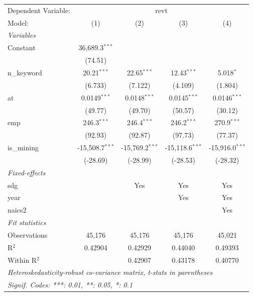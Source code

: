 
\begingroup
\centering
\begin{tabular}{lcccc}
   \tabularnewline \midrule \midrule
   Dependent Variable: & \multicolumn{4}{c}{revt}\\
   Model:       & (1)               & (2)               & (3)               & (4)\\  
   \midrule
   \emph{Variables}\\
   Constant     & 36,689.3$^{***}$  &                   &                   &   \\   
                & (74.51)           &                   &                   &   \\   
   n\_keyword   & 20.21$^{***}$     & 22.65$^{***}$     & 12.43$^{***}$     & 5.018$^{*}$\\   
                & (6.733)           & (7.122)           & (4.109)           & (1.804)\\   
   at           & 0.0149$^{***}$    & 0.0148$^{***}$    & 0.0145$^{***}$    & 0.0146$^{***}$\\   
                & (49.77)           & (49.70)           & (50.57)           & (30.12)\\   
   emp          & 246.3$^{***}$     & 246.4$^{***}$     & 246.2$^{***}$     & 270.9$^{***}$\\   
                & (92.93)           & (92.87)           & (97.73)           & (77.37)\\   
   is\_mining   & -15,508.7$^{***}$ & -15,769.2$^{***}$ & -15,118.6$^{***}$ & -15,916.0$^{***}$\\   
                & (-28.69)          & (-28.99)          & (-28.53)          & (-28.32)\\   
   \midrule
   \emph{Fixed-effects}\\
   sdg          &                   & Yes               & Yes               & Yes\\  
   year         &                   &                   & Yes               & Yes\\  
   naics2       &                   &                   &                   & Yes\\  
   \midrule
   \emph{Fit statistics}\\
   Observations & 45,176            & 45,176            & 45,176            & 45,021\\  
   R$^2$        & 0.42904           & 0.42929           & 0.44040           & 0.49393\\  
   Within R$^2$ &                   & 0.42907           & 0.43178           & 0.40770\\  
   \midrule \midrule
   \multicolumn{5}{l}{\emph{Heteroskedasticity-robust co-variance matrix, t-stats in parentheses}}\\
   \multicolumn{5}{l}{\emph{Signif. Codes: ***: 0.01, **: 0.05, *: 0.1}}\\
\end{tabular}
\par\endgroup


